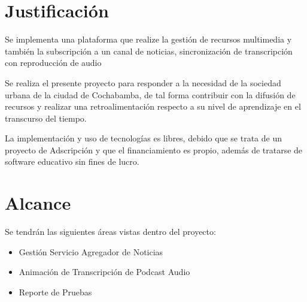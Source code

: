 \section{Justificaci\'{o}n}

Se implementa una plataforma que realize la gesti\'{o}n de recursos multimedia
y tambi\'{e}n la
subscripci\'{o}n a un canal de noticias, sincronizaci\'{o}n de transcripci\'{o}n
con reproducci\'{o}n de audio

Se realiza el presente proyecto para responder a la necesidad de la sociedad 
urbana de la ciudad de Cochabamba, de tal forma contribuir con la difusi\'{o}n
de recursos y realizar una retroalimentaci\'{o}n respecto a su nivel de 
aprendizaje en el transcurso del tiempo.

La implementaci\'{o}n y uso de tecnolog\'{i}as es libres, debido que se trata 
de un proyecto de Adscripci\'{o}n y que el financiamiento es propio, adem\'{a}s
de tratarse de software educativo sin fines de lucro.

\section{Alcance}

Se tendr\'{a}n las siguientes \'{a}reas vistas dentro del proyecto:

\begin{itemize}

\item Gesti\'{o}n Servicio Agregador de Noticias
\item Animaci\'{o}n de Transcripci\'{o}n de Podcast Audio
\item Reporte de Pruebas

\end{itemize}